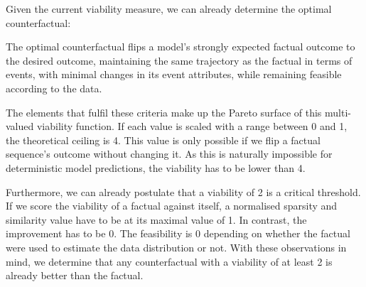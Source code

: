 \documentclass[./../../paper.tex]{subfiles}
\begin{document}
Given the current viability measure, we can already determine the optimal counterfactual:
\begin{displayquote}
    The optimal counterfactual flips a model's strongly expected factual outcome to the desired outcome, maintaining the same trajectory as the factual in terms of events, with minimal changes in its event attributes, while remaining feasible according to the data.
\end{displayquote}

\noindent The elements that fulfil these criteria make up the Pareto surface of this multi-valued viability function. If each value is scaled with a range between 0 and 1, the theoretical ceiling is 4. This value is only possible if we flip a factual sequence's outcome without changing it. As this is naturally impossible for deterministic model predictions, the viability has to be lower than 4. 

Furthermore, we can already postulate that a viability of 2 is a critical threshold. If we score the viability of a factual against itself, a normalised sparsity and similarity value have to be at its maximal value of 1. In contrast, the improvement has to be 0. The feasibility is 0 depending on whether the factual were used to estimate the data distribution or not. With these observations in mind, we determine that any counterfactual with a viability of at least 2 is already better than the factual. 
\end{document}

